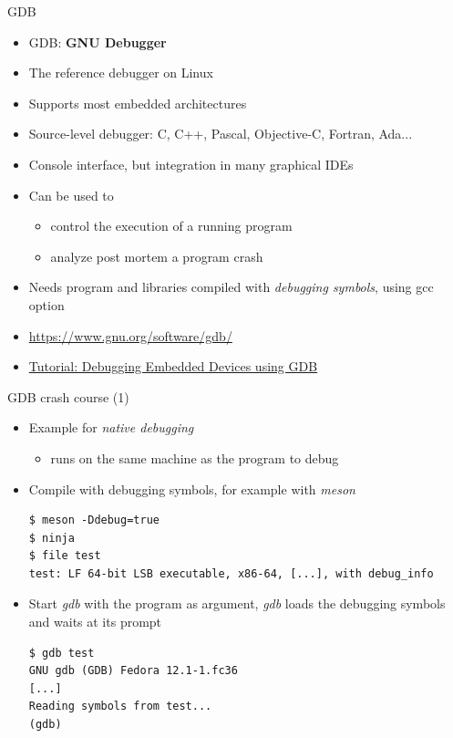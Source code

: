 \begin{frame}{GDB}
  \begin{itemize}
  \item GDB: {\bf GNU Debugger}
  \item The reference debugger on Linux
  \item Supports most embedded architectures
  \item Source-level debugger: C, C++, Pascal, Objective-C, Fortran,
    Ada...
  \item Console interface, but integration in many graphical IDEs
  \item Can be used to
    \begin{itemize}
    \item control the execution of a running program
    \item analyze post mortem a program crash
    \end{itemize}
  \item Needs program and libraries compiled with {\em debugging
      symbols}, using gcc  option
  \item \url{https://www.gnu.org/software/gdb/}
  \item \href{https://www.youtube.com/watch?v=JGhAgd2a_Ck}{Tutorial:
      Debugging Embedded Devices using GDB}
  \end{itemize}
\end{frame}

\begin{frame}[fragile]{GDB crash course (1)}
  \begin{itemize}
  \item Example for {\em native debugging}
    \begin{itemize}
    \item {} runs on the same machine as the program to debug
    \end{itemize}
  \item Compile with debugging symbols, for example with {\em meson}
    \begin{block}{}
      {\small
\begin{verbatim}
$ meson -Ddebug=true
$ ninja
$ file test
test: LF 64-bit LSB executable, x86-64, [...], with debug_info
\end{verbatim}
      }
    \end{block}
  \item Start {\em gdb} with the program as argument, {\em gdb} loads
    the debugging symbols and waits at its prompt
    \begin{block}{}
      {\small
\begin{verbatim}
$ gdb test
GNU gdb (GDB) Fedora 12.1-1.fc36
[...]
Reading symbols from test...
(gdb)
\end{verbatim}
      }
    \end{block}
  \end{itemize}
\end{frame}

